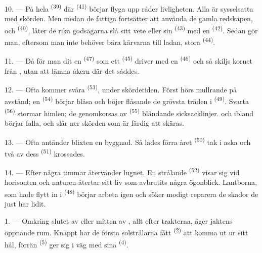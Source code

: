 10. --- På hela  \textsuperscript{(39)} där 
\textsuperscript{(41)} börjar flyga upp råder livligheten. Alla är sysselsatta med skörden.
Men medan de fattiga fortsätter att använda de gamla redskapen,
 och  \textsuperscript{(40)}, låter de rika
godsägarna slå sitt vete eller sin  \textsuperscript{(43)} med en
 \textsuperscript{(42)}. Sedan gör man, eftersom man inte
behöver bära kärvarna till ladan, stora  \textsuperscript{(44)}.

11. --- Då för man dit en  \textsuperscript{(47)} som ett
 \textsuperscript{(45)} driver med en 
\textsuperscript{(46)} och så skiljs kornet från , utan att lämna åkern där det
såddes.

\VUsaut{5.0mm}
\VUsaut{3.4mm}

12. --- Ofta kommer svåra  \textsuperscript{(53)}, under skördetiden. Först
hörs  mullrande på avstånd; en 
\textsuperscript{(54)} börjar blåsa och böjer flåsande de grövsta träden i
 \textsuperscript{(49)}. Svarta 
\textsuperscript{(56)} stormar himlen; de genomkorsas av 
\textsuperscript{(55)} bländande sicksacklinjer.  och ibland
 börjar falla, och slår ner skörden som är färdig att skäras.

13. --- Ofta antänder blixten en byggnad. Så lades förra året 
\textsuperscript{(50)} tak i aska och två av dess  \textsuperscript{(51)}
krossades.

14. --- Efter några timmar återvänder lugnet. En strålande 
\textsuperscript{(52)} visar sig vid horisonten och naturen återtar sitt liv som avbrutits
några ögonblick. Lantborna, som hade flytt in i  \textsuperscript{(48)}
börjar arbeta igen och söker modigt reparera de skador de just har lidit.

\VUsaut{6.0mm}
\VUsaut{3.6mm}

\VUsaut{1.4mm}
\VUsaut{4.0mm}

1. --- Omkring slutet av  eller mitten av , allt efter
trakterna, äger jaktens öppnande rum. Knappt har de första solstrålarna fått 
\textsuperscript{(2)} att komma ut ur sitt hål, förrän  \textsuperscript{(5)}
ger sig i väg med sina
 \textsuperscript{(4)}.

